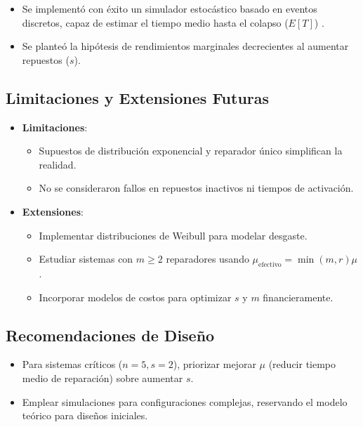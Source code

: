 \documentclass[a4paper, 12pt]{article}
\begin{document}
\begin{itemize}
    \item Se implementó con éxito un simulador estocástico basado en eventos discretos, capaz de estimar el tiempo medio hasta el colapso (\(E[T]\)) .
    \item Se planteó la hipótesis de rendimientos marginales decrecientes al aumentar repuestos (\(s\)).    \end{itemize}



\subsection*{Limitaciones y Extensiones Futuras}
\begin{itemize}
    \item \textbf{Limitaciones}: 
    \begin{itemize}
        \item Supuestos de distribución exponencial y reparador único simplifican la realidad.
        \item No se consideraron fallos en repuestos inactivos ni tiempos de activación.
    \end{itemize}
    \item \textbf{Extensiones}:
    \begin{itemize}
        \item Implementar distribuciones de Weibull para modelar desgaste.
        \item Estudiar sistemas con \(m \geq 2\) reparadores usando \(\mu_{\text{efectivo}} = \min(m, r)\mu\).
        \item Incorporar modelos de costos para optimizar \(s\) y \(m\) financieramente.
    \end{itemize}
\end{itemize}

\subsection*{Recomendaciones de Diseño}
\begin{itemize}
    \item Para sistemas críticos (\(n=5, s=2\)), priorizar mejorar \(\mu\) (reducir tiempo medio de reparación) sobre aumentar \(s\).
    \item Emplear simulaciones para configuraciones complejas, reservando el modelo teórico para diseños iniciales.
\end{itemize}
\end{document}
